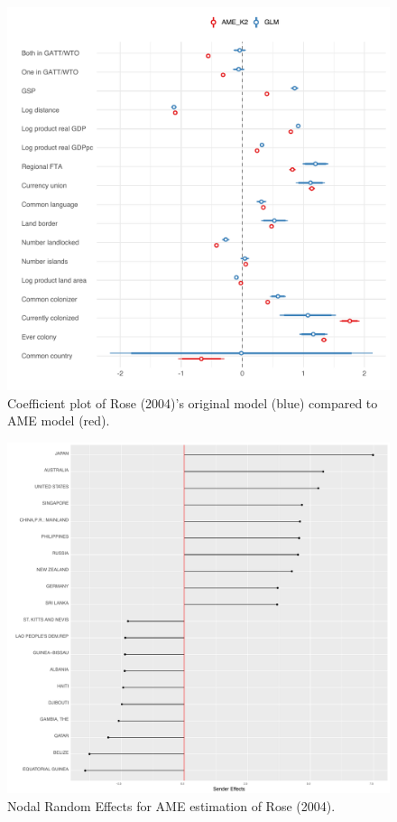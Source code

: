 \begin{figure}
\includegraphics[width=\textwidth]{rose_coefs_all_final.pdf}
 \caption{Coefficient plot of Rose (2004)'s original model (blue) compared to AME model (red).}\label{fig:roseCoef}
\end{figure}


\begin{figure}
\includegraphics[width=\textwidth]{ABplot_rose_top10.pdf}
 \caption{Nodal Random Effects for AME estimation of Rose (2004).}\label{fig:roser}
\end{figure}

